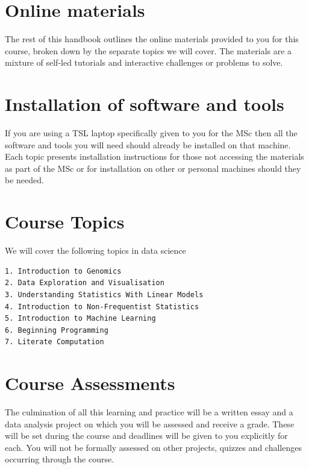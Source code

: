 \documentclass[
]{book}
\begin{document}
\hypertarget{online-materials}{%
\section{Online materials}\label{online-materials}}

The rest of this handbook outlines the online materials provided to you for this course, broken down by the separate topics we will cover. The materials are a mixture of self-led tutorials and interactive challenges or problems to solve.

\hypertarget{installation-of-software-and-tools}{%
\section{Installation of software and tools}\label{installation-of-software-and-tools}}

If you are using a TSL laptop specifically given to you for the MSc then all the software and tools you will need should already be installed on that machine. Each topic presents installation instructions for those not accessing the materials as part of the MSc or for installation on other or personal machines should they be needed.

\hypertarget{course-topics}{%
\section{Course Topics}\label{course-topics}}

We will cover the following topics in data science

\begin{verbatim}
1. Introduction to Genomics
2. Data Exploration and Visualisation
3. Understanding Statistics With Linear Models
4. Introduction to Non-Frequentist Statistics
5. Introduction to Machine Learning
6. Beginning Programming
7. Literate Computation
\end{verbatim}

\hypertarget{course-assessments}{%
\section{Course Assessments}\label{course-assessments}}

The culmination of all this learning and practice will be a written essay and a data analysis project on which you will be assessed and receive a grade. These will be set during the course and deadlines will be given to you explicitly for each. You will not be formally assessed on other projects, quizzes and challenges occurring through the course.
\end{document}
